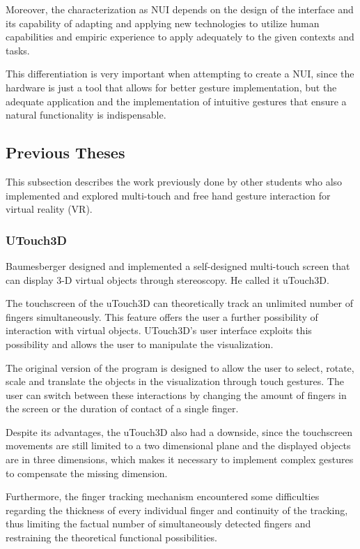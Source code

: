\documentclass[12pt]{extarticle}
\begin{document}
Moreover, the characterization as NUI depends on the design of the interface and its capability of adapting and applying new technologies to utilize human capabilities and empiric experience to apply adequately to the given contexts and tasks.

This differentiation is very important when attempting to create a NUI, since the hardware is just a tool that allows for better gesture implementation, but the adequate application and the implementation of intuitive gestures that ensure a natural functionality is indispensable.

\subsection {Previous Theses}
This subsection describes the work previously done by other students who also implemented and explored multi-touch and free hand gesture interaction for virtual reality (VR).

\subsubsection {UTouch3D}
Baumesberger designed and implemented a self-designed multi-touch screen that can display 3-D virtual objects through stereoscopy. He called it uTouch3D\cite{Bau10,Deli13}.

The touchscreen of the uTouch3D can theoretically track an unlimited number of fingers simultaneously. This feature offers the user a further possibility of interaction with virtual objects. UTouch3D\rq{}s user interface exploits this possibility and allows the user to manipulate the visualization.

The original version of the program \cite{Bau10} is designed to allow the user to select, rotate, scale and translate the objects in the visualization through touch gestures. The user can switch between these interactions by changing the amount of fingers in the screen or the duration of contact of a single finger.

Despite its advantages, the uTouch3D also had a downside, since the touchscreen movements are still limited to a two dimensional plane and the displayed objects are in three dimensions, which makes it necessary to implement complex gestures to compensate the missing dimension.

Furthermore, the finger tracking mechanism encountered some difficulties regarding the thickness of every individual finger and continuity of the tracking, thus limiting the factual number of simultaneously detected fingers and restraining the theoretical functional possibilities.
\end{document}
